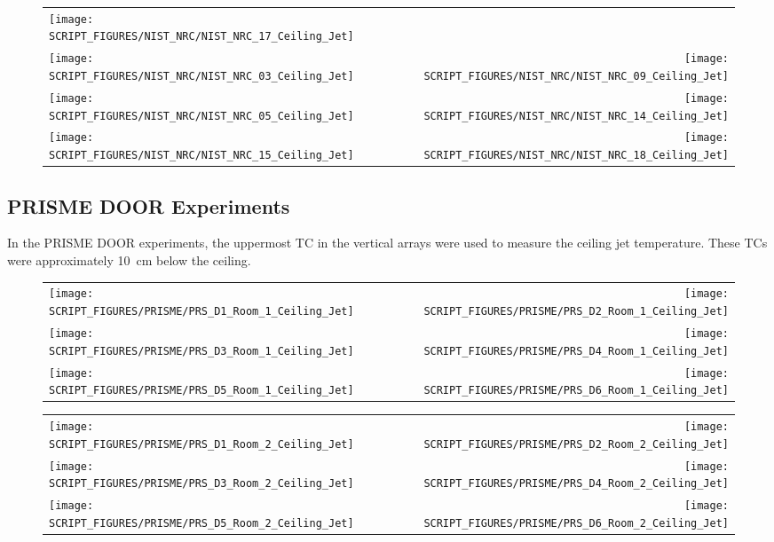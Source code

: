 \begin{figure}[p]
\begin{tabular*}{\textwidth}{l@{\extracolsep{\fill}}r}
\texttt{[image: SCRIPT\_FIGURES/NIST\_NRC/NIST\_NRC\_17\_Ceiling\_Jet]} &
 \\
\texttt{[image: SCRIPT\_FIGURES/NIST\_NRC/NIST\_NRC\_03\_Ceiling\_Jet]} &
\texttt{[image: SCRIPT\_FIGURES/NIST\_NRC/NIST\_NRC\_09\_Ceiling\_Jet]} \\
\texttt{[image: SCRIPT\_FIGURES/NIST\_NRC/NIST\_NRC\_05\_Ceiling\_Jet]} &
\texttt{[image: SCRIPT\_FIGURES/NIST\_NRC/NIST\_NRC\_14\_Ceiling\_Jet]} \\
\texttt{[image: SCRIPT\_FIGURES/NIST\_NRC/NIST\_NRC\_15\_Ceiling\_Jet]} &
\texttt{[image: SCRIPT\_FIGURES/NIST\_NRC/NIST\_NRC\_18\_Ceiling\_Jet]}
\end{tabular*}
\label{NIST_NRC_Jet_Open}
\end{figure}


\clearpage

\subsection{PRISME DOOR Experiments}

In the PRISME DOOR experiments, the uppermost TC in the vertical arrays were used to measure the ceiling jet temperature. These TCs were approximately 10~cm below the ceiling.

\begin{figure}[!ht]
\begin{tabular*}{\textwidth}{l@{\extracolsep{\fill}}r}
\texttt{[image: SCRIPT\_FIGURES/PRISME/PRS\_D1\_Room\_1\_Ceiling\_Jet]} &
\texttt{[image: SCRIPT\_FIGURES/PRISME/PRS\_D2\_Room\_1\_Ceiling\_Jet]} \\
\texttt{[image: SCRIPT\_FIGURES/PRISME/PRS\_D3\_Room\_1\_Ceiling\_Jet]} &
\texttt{[image: SCRIPT\_FIGURES/PRISME/PRS\_D4\_Room\_1\_Ceiling\_Jet]} \\
\texttt{[image: SCRIPT\_FIGURES/PRISME/PRS\_D5\_Room\_1\_Ceiling\_Jet]} &
\texttt{[image: SCRIPT\_FIGURES/PRISME/PRS\_D6\_Room\_1\_Ceiling\_Jet]} 
\end{tabular*}
\label{PRISME_Ceiling_Jet_Room_1}
\end{figure}

\begin{figure}[p]
\begin{tabular*}{\textwidth}{l@{\extracolsep{\fill}}r}
\texttt{[image: SCRIPT\_FIGURES/PRISME/PRS\_D1\_Room\_2\_Ceiling\_Jet]} &
\texttt{[image: SCRIPT\_FIGURES/PRISME/PRS\_D2\_Room\_2\_Ceiling\_Jet]} \\
\texttt{[image: SCRIPT\_FIGURES/PRISME/PRS\_D3\_Room\_2\_Ceiling\_Jet]} &
\texttt{[image: SCRIPT\_FIGURES/PRISME/PRS\_D4\_Room\_2\_Ceiling\_Jet]} \\
\texttt{[image: SCRIPT\_FIGURES/PRISME/PRS\_D5\_Room\_2\_Ceiling\_Jet]} &
\texttt{[image: SCRIPT\_FIGURES/PRISME/PRS\_D6\_Room\_2\_Ceiling\_Jet]}
\end{tabular*}
\label{PRISME_Ceiling_Jet_Room_2}
\end{figure}


